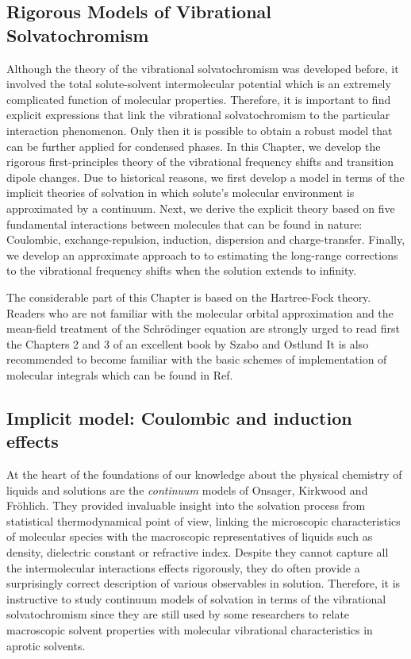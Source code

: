 \documentclass[a4paper,titlepage,twoside,fleqn,12pt]{book}
\begin{document}
\begin{refsection}
\chapter{Rigorous Models of Vibrational Solvatochromism \label{c:my-model}}

Although the theory of the vibrational solvatochromism
was developed before, it involved the total solute\hyp{}solvent
intermolecular potential which is an extremely complicated function
of molecular properties.
Therefore, it is important to find explicit 
expressions that link the vibrational solvatochromism
to the particular interaction phenomenon.
Only then it is possible to obtain a robust model
that can be further applied for condensed phases. 
In this Chapter, we develop the rigorous first\hyp{}principles
theory of the vibrational frequency shifts and transition
dipole changes.
Due to historical reasons, we first develop a model in terms
of the implicit theories of solvation in which solute's molecular
environment is approximated by a continuum. 
Next, we derive the explicit theory based on five fundamental interactions
between molecules that can be found in nature: Coulombic, 
exchange\hyp{}repulsion, induction, dispersion and charge\hyp{}transfer.
Finally, we develop an approximate approach to
to estimating the long\hyp{}range corrections to the vibrational
frequency shifts when the solution extends to infinity. 

The considerable
part of this Chapter is based on the Hartree\hyp{}Fock theory. \citep{Roothaan.RevModPhys.1951}
Readers who
are not familiar with the molecular orbital approximation and the mean\hyp{}field
treatment of the Schr{\"o}dinger equation are strongly urged to read first the
Chapters 2 and 3 of an excellent book by Szabo and Ostlund \citep{Szabo.Ostlund.ModernQuantumChemistry.1996}
It is also recommended to become familiar with the basic schemes of implementation of molecular
integrals which can be found in Ref. \citep{Cook.HandbookOfComputationalQuantumChemistry.2005}

\section{Implicit model: Coulombic and induction effects\label{s:implicit-model}}

At the heart of the foundations of our knowledge about the 
physical chemistry of liquids and solutions are the \emph{continuum}
models of Onsager, Kirkwood and Fr{\"o}hlich. They
provided invaluable insight into the solvation
process from statistical thermodynamical point of view, linking
the microscopic characteristics of molecular species
with the macroscopic representatives of liquids
such as density, dielectric constant or refractive index.
Despite they cannot capture all the intermolecular
interactions effects rigorously, they do often provide a surprisingly 
correct
description of various observables in solution.
Therefore, it is instructive to study continuum models of solvation
in terms of the vibrational solvatochromism since they 
are still used by some researchers to relate macroscopic
solvent properties with molecular vibrational characteristics
in aprotic solvents.


\end{refsection}
\end{document}
